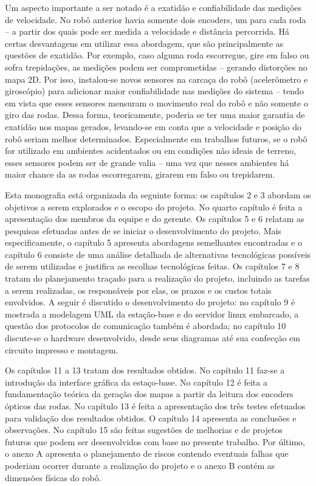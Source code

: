 Um aspecto importante a ser notado é a exatidão e confiabilidade das medições de velocidade. No robô anterior havia somente dois encoders, um para cada roda – a partir dos quais pode ser medida a velocidade e distância percorrida. Há certas desvantagens em utilizar essa abordagem, que são principalmente as questões de exatidão. Por exemplo, caso alguma roda escorregue, gire em falso ou sofra trepidações, as medições podem ser comprometidas – gerando distorções no mapa 2D. Por isso, instalou-se novos sensores na carcaça do robô (acelerômetro e giroscópio) para adicionar maior confiabilidade nas medições do sistema – tendo em vista que esses sensores mensuram o movimento real do robô e não somente o giro das rodas. Dessa forma, teoricamente, poderia se ter uma maior garantia de exatidão nos mapas gerados, levando-se em conta que a velocidade e posição do robô seriam melhor determinados. Especialmente em trabalhos futuros, se o robô for utilizado em ambientes acidentados ou em condições não ideais de terreno, esses sensores podem ser de grande valia – uma vez que nesses ambientes há maior chance da as rodas escorregarem, girarem em falso ou trepidarem.

Esta monografia está organizada da seguinte forma: os capítulos 2 e 3 abordam os objetivos a serem explorados e o escopo do projeto. No quarto capítulo é feita a apresentação dos membros da equipe e do gerente. Os capítulos 5 e 6 relatam as pesquisas efetuadas antes de se iniciar o desenvolvimento do projeto. Mais especificamente, o capítulo 5 apresenta abordagens semelhantes encontradas e o capítulo 6 consiste de uma análise detalhada de alternativas tecnológicas possíveis de serem utilizadas e justifica as escolhas tecnológicas feitas. Os capítulos 7 e 8 tratam do planejamento traçado para a realização do projeto, incluindo as tarefas a serem realizadas, os responsáveis por elas, os prazos e os custos totais envolvidos. A seguir é discutido o desenvolvimento do projeto: no capítulo 9 é mostrada a modelagem UML da estação-base e do servidor linux embarcado, a questão dos protocolos de comunicação também é abordada; no capítulo 10 discute-se o hardware desenvolvido, desde seus diagramas até sua confecção em circuito impresso e montagem. 

Os capítulos 11 a 13 tratam dos resultados obtidos. No capítulo 11 faz-se a introdução da interface gráfica da estaço-base. No capítulo 12 é feita a fundamentação teórica da geração dos mapas a partir da leitura dos encoders ópticos das rodas. No capítulo 13 é feita a apresentação dos três testes efetuados para validação dos resultados obtidos. O capítulo 14 apresenta as conclusões e observações. No capítulo 15 são feitas sugestões de melhorias e de projetos futuros que podem ser desenvolvidos com base no presente trabalho. Por último, o anexo A apresenta o planejamento de riscos contendo eventuais falhas que poderiam ocorrer durante a realização do projeto e o anexo B contém as dimensões físicas do robô.

